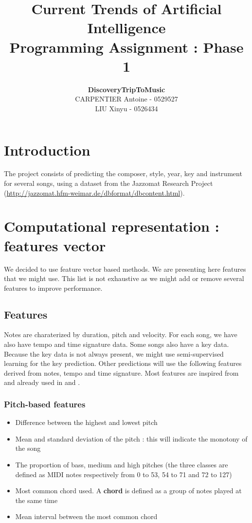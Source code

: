 \documentclass[a4paper,12pt]{article}
\author{\textbf{DiscoveryTripToMusic}\\CARPENTIER Antoine - 0529527 \\LIU Xinyu - 0526434}
\title{Current Trends of Artificial Intelligence\\ \small Programming Assignment : Phase 1}
\begin{document}
\maketitle

\section{Introduction}

The project consists of predicting the composer, style, year, key and instrument for several songs, using a dataset from the Jazzomat Research Project (\url{http://jazzomat.hfm-weimar.de/dbformat/dbcontent.html}).

\section{Computational representation : features vector}

We decided to use feature vector based methods. We are presenting here features that we might use. This list is not exhaustive as we might add or remove several features to improve performance.

\subsection{Features}
    Notes are charaterized by duration, pitch and velocity. For each song, we have also have tempo and time signature data. Some songs also have a key data. Because the key data is not always present, we might use semi-supervised learning for the key prediction.
    Other predictions will use the following features derived from notes, tempo and time signature. Most features are inspired from \cite{mckay2004} and already used in \cite{mckay2004automatic} and \cite{mckay2004automatic2}.

    \subsubsection{Pitch-based features}
        \begin{itemize}
            \item Difference between the highest and lowest pitch
            \item Mean and standard deviation of the pitch : this will indicate the monotony of the song
            \item The proportion of bass, medium and high pitches (the three classes are defined as MIDI notes respectively from 0 to 53, 54 to 71 and 72 to 127)
            \item Most common chord used. A \textbf{chord} is defined as a group of notes played at the same time
            \item Mean interval between the most common chord
        \end{itemize}
\end{document}
